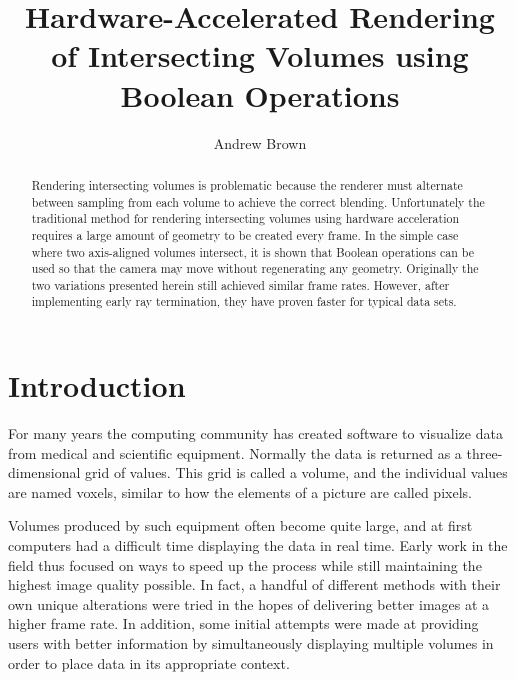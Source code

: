 \documentclass{report}
\begin{document}
\title{Hardware-Accelerated Rendering of Intersecting Volumes using Boolean Operations}
\author{Andrew Brown}

\beforepreface
\afterpreface

\begin{abstract}
Rendering intersecting volumes is problematic because the renderer must
alternate between sampling from each volume to achieve the correct blending.
Unfortunately the traditional method for rendering intersecting volumes using
hardware acceleration requires a large amount of geometry to be created every
frame.  In the simple case where two axis-aligned volumes intersect, it is shown
that Boolean operations can be used so that the camera may move without
regenerating any geometry.  Originally the two variations presented herein
still achieved similar frame rates.  However, after implementing early ray
termination, they have proven faster for typical data sets.
\end{abstract}

\pagestyle{plain}

\chapter{Introduction}

For many years the computing community has created software to visualize data
from medical and scientific equipment.  Normally the data is returned as a
three-dimensional grid of values.  This grid is called a volume, and the
individual values are named voxels, similar to how the elements of a picture are
called pixels.

Volumes produced by such equipment often become quite large, and at first
computers had a difficult time displaying the data in real time.  Early work in
the field thus focused on ways to speed up the process while still maintaining
the highest image quality possible.  In fact, a handful of different methods
with their own unique alterations were tried in the hopes of delivering better
images at a higher frame rate.  In addition, some initial attempts were made at
providing users with better information by simultaneously displaying multiple
volumes in order to place data in its appropriate context.
\end{document}
